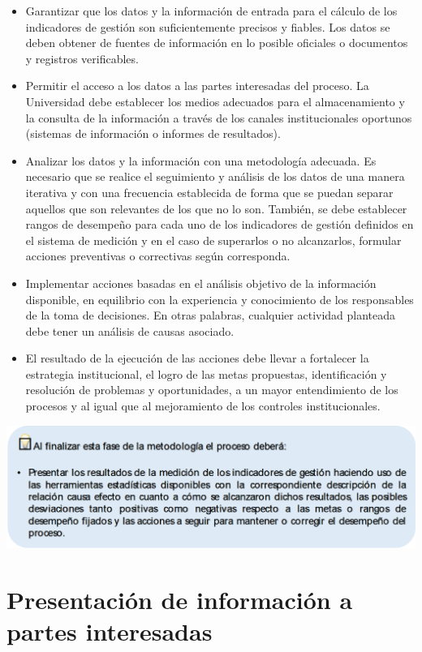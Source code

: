 \documentclass[
]{book}
\begin{document}
\begin{itemize}
\item
  Garantizar que los datos y la información de entrada para el cálculo de los indicadores de gestión son suficientemente precisos y fiables. Los datos se deben obtener de fuentes de información en lo posible oficiales o documentos y registros verificables.
\item
  Permitir el acceso a los datos a las partes interesadas del proceso. La Universidad debe establecer los medios adecuados para el almacenamiento y la consulta de la información a través de los canales institucionales oportunos (sistemas de información o informes de resultados).
\item
  Analizar los datos y la información con una metodología adecuada. Es necesario que se realice el seguimiento y análisis de los datos de una manera iterativa y con una frecuencia establecida de forma que se puedan separar aquellos que son relevantes de los que no lo son. También, se debe establecer rangos de desempeño para cada uno de los indicadores de gestión definidos en el sistema de medición y en el caso de superarlos o no alcanzarlos, formular acciones preventivas o correctivas según corresponda.
\item
  Implementar acciones basadas en el análisis objetivo de la información disponible, en equilibrio con la experiencia y conocimiento de los responsables de la toma de decisiones. En otras palabras, cualquier actividad planteada debe tener un análisis de causas asociado.
\item
  El resultado de la ejecución de las acciones debe llevar a fortalecer la estrategia institucional, el logro de las metas propuestas, identificación y resolución de problemas y oportunidades, a un mayor entendimiento de los procesos y al igual que al mejoramiento de los controles institucionales.
\end{itemize}

\begin{center}\includegraphics[width=0.8\linewidth]{Imagenes/texto_8} \end{center}

\hypertarget{presentaciuxf3n-de-informaciuxf3n-a-partes-interesadas}{%
\chapter{Presentación de información a partes interesadas}\label{presentaciuxf3n-de-informaciuxf3n-a-partes-interesadas}}
\end{document}
